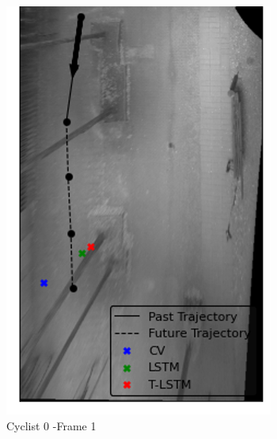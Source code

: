 \documentclass{article}
\begin{document}
\begin{figure}[H]
\centering
\begin{subfigure}{0.4\textwidth}
  \centering
  \includegraphics[width=\linewidth]{quali_results/cyc-0-1.png}
  \caption{Cyclist 0 -Frame 1}
  \label{fig:cyc0-1}
\end{subfigure}
\begin{subfigure}{0.4\textwidth}
  \centering

\end{subfigure}
\end{figure}
\end{document}

